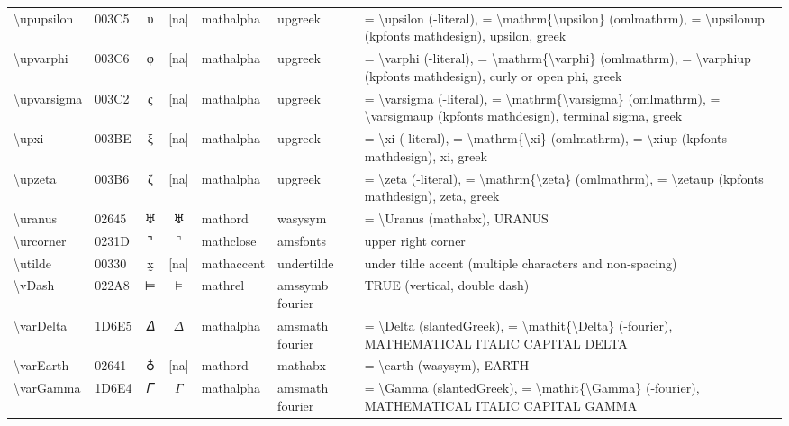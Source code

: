 \documentclass[a4paper,landscape]{article}
\begin{document}
\begin{longtable}{llcclll}
\textbackslash{}upupsilon & 003C5 & υ & [na] & mathalpha & upgreek & = \textbackslash{}upsilon (-literal), = \textbackslash{}mathrm\{\textbackslash{}upsilon\} (omlmathrm),  = \textbackslash{}upsilonup (kpfonts mathdesign),  upsilon,  greek \\
\textbackslash{}upvarphi & 003C6 & φ & [na] & mathalpha & upgreek & = \textbackslash{}varphi (-literal), = \textbackslash{}mathrm\{\textbackslash{}varphi\} (omlmathrm),  = \textbackslash{}varphiup (kpfonts mathdesign),  curly or open phi,  greek \\
\textbackslash{}upvarsigma & 003C2 & ς & [na] & mathalpha & upgreek & = \textbackslash{}varsigma (-literal), = \textbackslash{}mathrm\{\textbackslash{}varsigma\} (omlmathrm),  = \textbackslash{}varsigmaup (kpfonts mathdesign),  terminal sigma,  greek \\
\textbackslash{}upxi & 003BE & ξ & [na] & mathalpha & upgreek & = \textbackslash{}xi (-literal), = \textbackslash{}mathrm\{\textbackslash{}xi\} (omlmathrm),  = \textbackslash{}xiup (kpfonts mathdesign),  xi,  greek \\
\textbackslash{}upzeta & 003B6 & ζ & [na] & mathalpha & upgreek & = \textbackslash{}zeta (-literal), = \textbackslash{}mathrm\{\textbackslash{}zeta\} (omlmathrm),  = \textbackslash{}zetaup (kpfonts mathdesign),  zeta,  greek \\
\textbackslash{}uranus & 02645 & \textsf ♅ & $\uranus$ & mathord & wasysym & = \textbackslash{}Uranus (mathabx), URANUS \\
\textbackslash{}urcorner & 0231D & ⌝ & $\urcorner$ & mathclose & amsfonts & upper right corner \\
\textbackslash{}utilde & 00330 & x̰ & [na] & mathaccent & undertilde & under tilde accent (multiple characters and non-spacing) \\
\textbackslash{}vDash & 022A8 & ⊨ & $\vDash$ & mathrel & amssymb fourier & TRUE (vertical, double dash) \\
\textbackslash{}varDelta & 1D6E5 & 𝛥 & $\varDelta$ & mathalpha & amsmath fourier & = \textbackslash{}Delta (slantedGreek), = \textbackslash{}mathit\{\textbackslash{}Delta\} (-fourier),  MATHEMATICAL ITALIC CAPITAL DELTA \\
\textbackslash{}varEarth & 02641 & \textsf ♁ & [na] & mathord & mathabx & = \textbackslash{}earth (wasysym),  EARTH \\
\textbackslash{}varGamma & 1D6E4 & 𝛤 & $\varGamma$ & mathalpha & amsmath fourier & = \textbackslash{}Gamma (slantedGreek), = \textbackslash{}mathit\{\textbackslash{}Gamma\} (-fourier),  MATHEMATICAL ITALIC CAPITAL GAMMA \\

\end{longtable}
\end{document}
